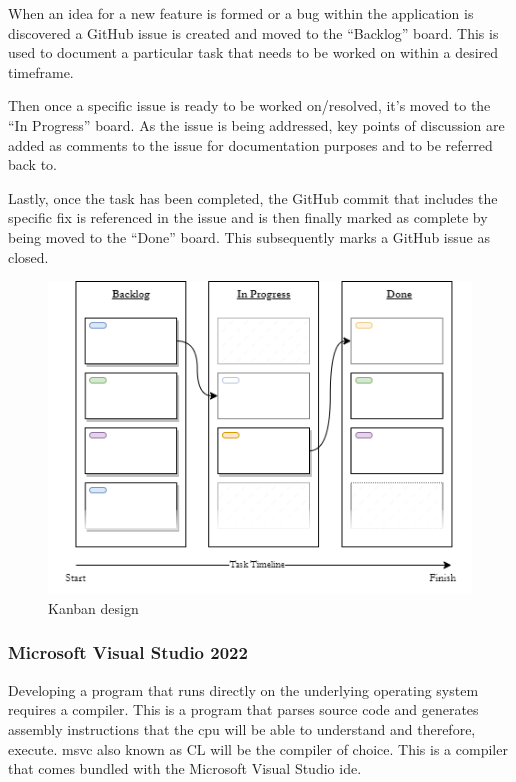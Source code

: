 \documentclass[11pt]{article}
\begin{document}
When an idea for a new feature is formed or a bug within the application is
discovered a GitHub issue is created and moved to the ``Backlog'' board. This is
used to document a particular task that needs to be worked on within a desired
timeframe.

Then once a specific issue is ready to be worked on/resolved, it's moved to the
``In Progress'' board. As the issue is being addressed, key points of discussion
are added as comments to the issue for documentation purposes and to be referred
back to.

Lastly, once the task has been completed, the GitHub commit that includes the
specific fix is referenced in the issue and is then finally marked as complete
by being moved to the ``Done'' board. This subsequently marks a GitHub issue as
closed.

\begin{figure}[h!]
  \centering
  \includegraphics[width=\textwidth]{images/kanban_design.png}
  \caption{Kanban design}
  \label{fig:kanban_design}
\end{figure}

\subsubsection{Microsoft Visual Studio 2022}
Developing a program that runs directly on the underlying operating system
requires a compiler. This is a program that parses source code and generates
assembly instructions that the \gls{cpu} will be able to understand and
therefore, execute. \gls{msvc} also known as CL will be the compiler of choice.
This is a compiler that comes bundled with the Microsoft Visual Studio
\gls{ide}.
\end{document}
